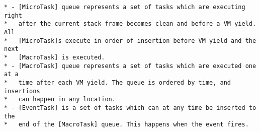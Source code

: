\begin{verbatim}
* - [MicroTask] queue represents a set of tasks which are executing right
*   after the current stack frame becomes clean and before a VM yield. All
*   [MicroTask]s execute in order of insertion before VM yield and the next
*   [MacroTask] is executed.
* - [MacroTask] queue represents a set of tasks which are executed one at a
*   time after each VM yield. The queue is ordered by time, and insertions
*   can happen in any location.
* - [EventTask] is a set of tasks which can at any time be inserted to the
*   end of the [MacroTask] queue. This happens when the event fires.
\end{verbatim}
